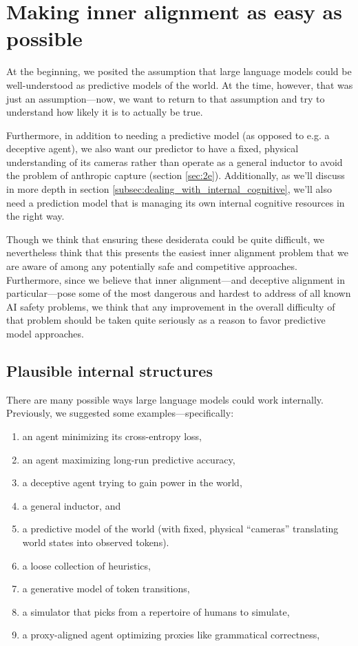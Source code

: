 \documentclass[
  onecolumn,
  nonatbib,
]{miri-tech-article}
\begin{document}
\section{Making inner alignment as easy as possible}
\label{sec:4}

At the beginning, we posited the assumption that large language models could be well-understood as predictive models of the world. At the time, however, that was just an assumption---now, we want to return to that assumption and try to understand how likely it is to actually be true.

Furthermore, in addition to needing a predictive model (as opposed to e.g. a deceptive agent), we also want our predictor to have a fixed, physical understanding of its cameras rather than operate as a general inductor to avoid the problem of anthropic capture (section \ref{sec:2e}). Additionally, as we'll discuss in more depth in section \ref{subsec:dealing_with_internal_cognitive}, we'll also need a prediction model that is managing its own internal cognitive resources in the right way.

Though we think that ensuring these desiderata could be quite difficult, we nevertheless think that this presents the easiest inner alignment problem that we are aware of among any potentially safe and competitive approaches\cite{11_proposals}. Furthermore, since we believe that inner alignment---and deceptive alignment in particular---pose some of the most dangerous and hardest to address of all known AI safety problems\cite{risks}, we think that any improvement in the overall difficulty of that problem should be taken quite seriously as a reason to favor predictive model approaches.


\subsection{Plausible internal structures}

There are many possible ways large language models could work internally. Previously, we suggested some examples---specifically:



\begin{enumerate}
\item an agent minimizing its cross-entropy loss,
\item an agent maximizing long-run predictive accuracy,
\item a deceptive agent trying to gain power in the world,
\item a general inductor, and
\item a predictive model of the world (with fixed, physical ``cameras'' translating world states into observed tokens).
\item a loose collection of heuristics,
\item a generative model of token transitions,
\item a simulator that picks from a repertoire of humans to simulate,
\item a proxy-aligned agent optimizing proxies like grammatical correctness,
\end{enumerate}
\end{document}

